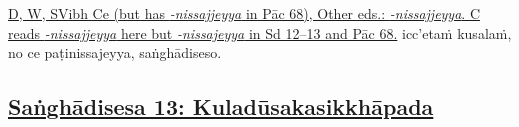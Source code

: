 {{{		\hypertarget{endnote87-appendix}{\hyperlink{endnote87-body}{D, W, SVibh Ce (but has \textit{-nissajjeyya} in Pāc 68), Other eds.: \textit{-nissajjeyya}. C reads \textit{-nissajjeyya} here but \textit{-nissajeyya} in Sd 12–13
and Pāc 68.}}}}}\makeatother{} icc'etaṁ kusalaṁ, no ce paṭinissajeyya,\makeatletter\hyperlink{endnote88-appendix}\makeatother{} saṅghādiseso.



\subsection*{\hyperref[comm13]{Saṅghādisesa 13: Kuladūsakasikkhāpada}}
\label{sd13}

